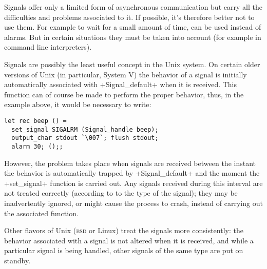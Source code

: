 Signals offer only a limited form of asynchronous communication but
carry all the difficulties and problems associated to it. If possible,
it's therefore better not to use them. For example to wait for a small
amount of time,  can be used instead of alarms. But
in certain situations they must be taken into account (for example in
command line interpreters).

Signals are possibly the least useful concept in the Unix system.  On
certain older versions of Unix (in particular, System V) the behavior
of a signal is initially automatically associated with
\ml+Signal_default+ when it is received.  This function can of course
be made to perform the proper behavior, thus, in the 
example above, it would be necessary to write:

\begin{lstlisting}
let rec beep () =
  set_signal SIGALRM (Signal_handle beep);
  output_char stdout `\007`; flush stdout;
  alarm 30; ();;
\end{lstlisting}

However, the problem takes place when signals are received between the
instant the behavior is automatically trapped by \ml+Signal_default+
and the moment the \ml+set_signal+ function is carried out.  
Any signals received during this interval are not treated correctly 
(according to to the type of the signal); they may be inadvertently 
ignored, or might cause the process to crash, instead of carrying 
out the associated function.

Other flavors of Unix (\textsc{bsd} or Linux) treat the 
signals more consistently: the behavior associated with a 
signal is not altered when it is received, and while a particular 
signal is being handled, other signals of the same type are put on standby.

